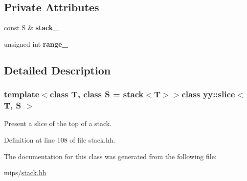 \subsection*{Private Attributes}
\begin{DoxyCompactItemize}
\item 
\hypertarget{classyy_1_1slice_aa2616ed99d173cc4c3ebdb8d067f513f}{const S \& {\bfseries stack\-\_\-}}\label{classyy_1_1slice_aa2616ed99d173cc4c3ebdb8d067f513f}

\item 
\hypertarget{classyy_1_1slice_ab9c0f9775d55a20ebab97e056a7cd152}{unsigned int {\bfseries range\-\_\-}}\label{classyy_1_1slice_ab9c0f9775d55a20ebab97e056a7cd152}

\end{DoxyCompactItemize}


\subsection{Detailed Description}
\subsubsection*{template$<$class T, class S = stack$<$\-T$>$$>$class yy\-::slice$<$ T, S $>$}

Present a slice of the top of a stack. 

Definition at line 108 of file stack.\-hh.



The documentation for this class was generated from the following file\-:\begin{DoxyCompactItemize}
\item 
mips/\hyperlink{stack_8hh}{stack.\-hh}\end{DoxyCompactItemize}
